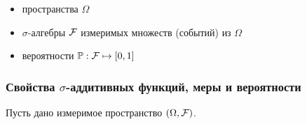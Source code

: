 \begin{itemize}

\item
  пространства \(\Omega\)
\item
  \(\sigma\)-алгебры \(\mathcal F\) измеримых множеств (событий) из
  \(\Omega\)
\item
  вероятности \(\mathbb P : \mathcal F\mapsto [0,1]\)
\end{itemize}

\subsubsection{\texorpdfstring{Свойства \(\sigma\)-аддитивных функций,
меры и
вероятности}{Свойства \textbackslash{}sigma-аддитивных функций, меры и вероятности}}\label{ux441ux432ux43eux439ux441ux442ux432ux430-sigma-ux430ux434ux434ux438ux442ux438ux432ux43dux44bux445-ux444ux443ux43dux43aux446ux438ux439-ux43cux435ux440ux44b-ux438-ux432ux435ux440ux43eux44fux442ux43dux43eux441ux442ux438}

Пусть дано измеримое пространство \((\Omega, \mathcal F)\).

